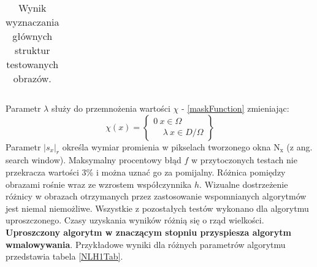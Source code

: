 \documentclass[12pt, twoside, openany]{report}
\theoremstyle{definition}
\begin{document}
\begin{longtable}[h!]{|c|c|}
	\caption{Wynik wyznaczania głównych struktur testowanych obrazów.}
	\label{NLCTVVSNLHI}
\end{longtable}
Parametr $\lambda$ służy do przemnożenia wartości $\chi$ - \eqref{maskFunction} zmieniając:
\begin{equation}
\chi \left(x\right)=\left\{ \begin{array}{c}
0\ x \in \Omega \\ 
\ \ \ \ \ \lambda\ x \in D/ \Omega \end{array}
\right\}
\end{equation}
Parametr $|s_x|_r$ określa wymiar promienia w pikselach tworzonego okna $\mathrm{N_x}$ (z ang. search window).
Maksymalny procentowy błąd $f$ w przytoczonych testach nie przekracza wartości 3\% i można uznać go za pomijalny. Różnica pomiędzy obrazami rośnie wraz ze wzrostem współczynnika $h$. Wizualne dostrzeżenie różnicy w obrazach otrzymanych przez zastosowanie wspomnianych algorytmów jest niemal niemożliwe. Wszystkie z pozostałych testów wykonano dla algorytmu uproszczonego. Czasy uzyskania wyników różnią się o rząd wielkości. \textbf{Uproszczony algorytm w znaczącym stopniu przyspiesza algorytm wmalowywania}. Przykładowe wyniki dla różnych parametrów algorytmu przedstawia tabela \autoref{NLH1Tab}.
\end{document}

